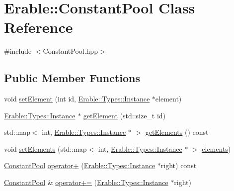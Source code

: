 \hypertarget{class_erable_1_1_constant_pool}{}\section{Erable\+::Constant\+Pool Class Reference}
\label{class_erable_1_1_constant_pool}


{\ttfamily \#include $<$Constant\+Pool.\+hpp$>$}

\subsection*{Public Member Functions}
\begin{DoxyCompactItemize}
\item 
void \mbox{\hyperlink{class_erable_1_1_constant_pool_aeac06f9561bede54a4910dc6ec25dd0e}{set\+Element}} (int id, \mbox{\hyperlink{class_erable_1_1_erable_1_1_types_1_1_instance}{Erable\+::\+Types\+::\+Instance}} $\ast$element)
\item 
\mbox{\hyperlink{class_erable_1_1_erable_1_1_types_1_1_instance}{Erable\+::\+Types\+::\+Instance}} $\ast$ \mbox{\hyperlink{class_erable_1_1_constant_pool_a730533e6a8846e302b3f4f4a0073c7bd}{get\+Element}} (std\+::size\+\_\+t id)
\item 
std\+::map$<$ int, \mbox{\hyperlink{class_erable_1_1_erable_1_1_types_1_1_instance}{Erable\+::\+Types\+::\+Instance}} $\ast$ $>$ \mbox{\hyperlink{class_erable_1_1_constant_pool_a4500d22d53ef55279a5b8d225e06dbb1}{get\+Elements}} () const
\item 
void \mbox{\hyperlink{class_erable_1_1_constant_pool_ac498e15605946f259ea08acd1bc07589}{set\+Elements}} (std\+::map$<$ int, \mbox{\hyperlink{class_erable_1_1_erable_1_1_types_1_1_instance}{Erable\+::\+Types\+::\+Instance}} $\ast$ $>$ \mbox{\hyperlink{class_erable_1_1_constant_pool_a5f02e366a42ade736b908744e1052b09}{elements}})
\item 
\mbox{\hyperlink{class_erable_1_1_constant_pool}{Constant\+Pool}} \mbox{\hyperlink{class_erable_1_1_constant_pool_ad730edcba5cb7befc1468072dcc601dd}{operator+}} (\mbox{\hyperlink{class_erable_1_1_erable_1_1_types_1_1_instance}{Erable\+::\+Types\+::\+Instance}} $\ast$right) const
\item 
\mbox{\hyperlink{class_erable_1_1_constant_pool}{Constant\+Pool}} \& \mbox{\hyperlink{class_erable_1_1_constant_pool_a910c3a76017076dcbb4930b3a9f30440}{operator+=}} (\mbox{\hyperlink{class_erable_1_1_erable_1_1_types_1_1_instance}{Erable\+::\+Types\+::\+Instance}} $\ast$right)

\end{DoxyCompactItemize}
